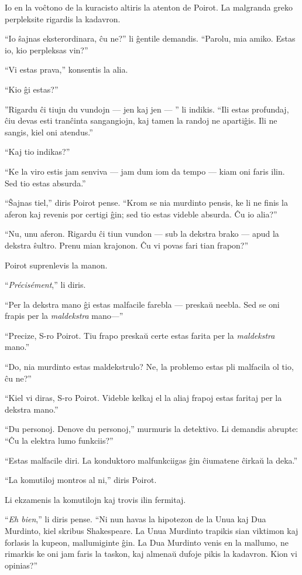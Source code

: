Io en la voĉtono de la kuracisto altiris la atenton de Poirot. La malgranda greko perpleksite rigardis la kadavron.

``Io ŝajnas eksterordinara, ĉu ne?'' li ĝentile demandis. ``Parolu, mia amiko. Estas io, kio perpleksas vin?''

``Vi estas prava,'' konsentis la alia.

``Kio ĝi estas?''

''Rigardu ĉi tiujn du vundojn --- jen kaj jen --- '' li indikis. ``Ili estas profundaj, ĉiu devas esti tranĉinta sangangiojn, kaj tamen la randoj ne apartiĝis. Ili ne sangis, kiel oni atendus.''

``Kaj tio indikas?''

``Ke la viro estis jam senviva --- jam dum iom da tempo --- kiam oni faris ilin. Sed tio estas absurda.''

``Ŝajnas tiel,'' diris Poirot pense. ``Krom se nia murdinto pensis, ke li ne finis la aferon kaj revenis por certigi ĝin; sed tio estas videble absurda. Ĉu io alia?''

``Nu, unu aferon. Rigardu ĉi tiun vundon --- sub la dekstra brako --- apud la dekstra ŝultro. Prenu mian krajonon. Ĉu vi povas fari tian frapon?''

Poirot suprenlevis la manon.

``\emph{Précisément},'' li diris.

``Per la dekstra mano ĝi estas malfacile farebla --- preskaŭ neebla. Sed se oni frapis per la \emph{maldekstra} mano---''

``Precize, S-ro Poirot. Tiu frapo preskaŭ certe estas farita per la \emph{maldekstra} mano.''

``Do, nia murdinto estas maldekstrulo? Ne, la problemo estas pli malfacila ol tio, ĉu ne?''

``Kiel vi diras, S-ro Poirot. Videble kelkaj el la aliaj frapoj estas faritaj per la dekstra mano.''

``Du personoj. Denove du personoj,'' murmuris la detektivo. Li demandis abrupte: ``Ĉu la elektra lumo funkciis?''

``Estas malfacile diri. La konduktoro malfunkciigas ĝin ĉiumatene ĉirkaŭ la deka.''

``La komutiloj montros al ni,'' diris Poirot.

Li ekzamenis la komutilojn kaj trovis ilin fermitaj.

``\emph{Eh bien},'' li diris pense. ``Ni nun havas la hipotezon de la Unua kaj Dua Murdinto, kiel skribus Shakespeare. La Unua Murdinto trapikis sian viktimon kaj forlasis la kupeon, mallumiginte ĝin. La Dua Murdinto venis en la mallumo, ne rimarkis ke oni jam faris la taskon, kaj almenaŭ dufoje pikis la kadavron. Kion vi opinias?''

